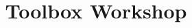 

\usetikzlibrary{trees}
\usepackage[edges]{forest}

\title[Intro]{Toolbox Workshop}



\maketitle








